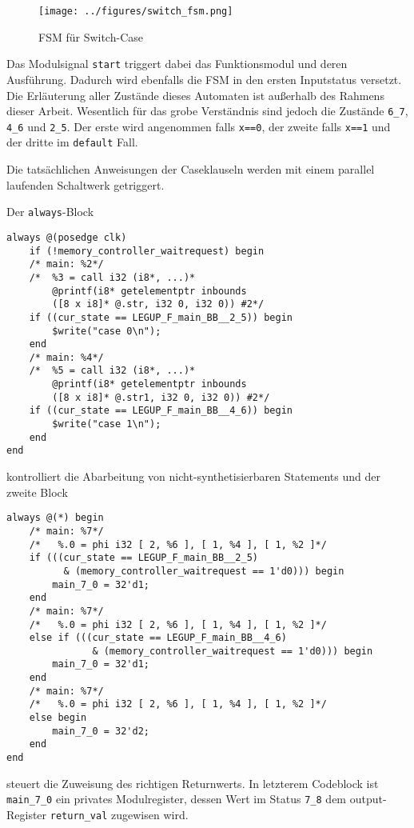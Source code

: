 \documentclass[oneside,a4paper]{article}
\def\V#1{\lstinline[style=verilog]{#1}}
\def\C#1{\lstinline[style=c]{#1}}
\begin{document}
\begin{figure}[H]
  \centering
  \texttt{[image: ../figures/switch\_fsm.png]}
  \caption{FSM für Switch-Case}
\label{fig:switch_fsm}
\end{figure}

Das Modulsignal \V{start} triggert dabei das Funktionsmodul
und deren Ausführung. Dadurch wird ebenfalls die FSM in
den ersten Inputstatus versetzt. Die Erläuterung aller
Zustände dieses Automaten ist außerhalb des Rahmens dieser Arbeit.
Wesentlich für das grobe Verständnis sind jedoch die
Zustände \V{6_7}, \V{4_6} und \V{2_5}. Der erste wird angenommen
falls \V{x==0}, der zweite falls \V{x==1} und der dritte im \C{default} Fall.

Die tatsächlichen Anweisungen der Caseklauseln werden mit einem
parallel laufenden Schaltwerk getriggert.

Der \V{always}-Block

\begin{lstlisting}[style=verilog]
always @(posedge clk)
    if (!memory_controller_waitrequest) begin
    /* main: %2*/
    /*  %3 = call i32 (i8*, ...)*
        @printf(i8* getelementptr inbounds
        ([8 x i8]* @.str, i32 0, i32 0)) #2*/
    if ((cur_state == LEGUP_F_main_BB__2_5)) begin
        $write("case 0\n");
    end
    /* main: %4*/
    /*  %5 = call i32 (i8*, ...)*
        @printf(i8* getelementptr inbounds
        ([8 x i8]* @.str1, i32 0, i32 0)) #2*/
    if ((cur_state == LEGUP_F_main_BB__4_6)) begin
        $write("case 1\n");
    end
end
\end{lstlisting}

kontrolliert die Abarbeitung von nicht-synthetisierbaren
Statements und der zweite Block

\begin{lstlisting}[style=verilog]
always @(*) begin
    /* main: %7*/
    /*   %.0 = phi i32 [ 2, %6 ], [ 1, %4 ], [ 1, %2 ]*/
    if (((cur_state == LEGUP_F_main_BB__2_5)
          & (memory_controller_waitrequest == 1'd0))) begin
        main_7_0 = 32'd1;
    end
    /* main: %7*/
    /*   %.0 = phi i32 [ 2, %6 ], [ 1, %4 ], [ 1, %2 ]*/
    else if (((cur_state == LEGUP_F_main_BB__4_6)
               & (memory_controller_waitrequest == 1'd0))) begin
        main_7_0 = 32'd1;
    end
    /* main: %7*/
    /*   %.0 = phi i32 [ 2, %6 ], [ 1, %4 ], [ 1, %2 ]*/
    else begin
        main_7_0 = 32'd2;
    end
end
\end{lstlisting}

steuert die Zuweisung des richtigen Returnwerts. In letzterem
Codeblock ist \V{main_7_0} ein privates Modulregister, dessen
Wert im Status \V{7_8} dem output-Register \V{return_val} zugewisen wird.
\end{document}
